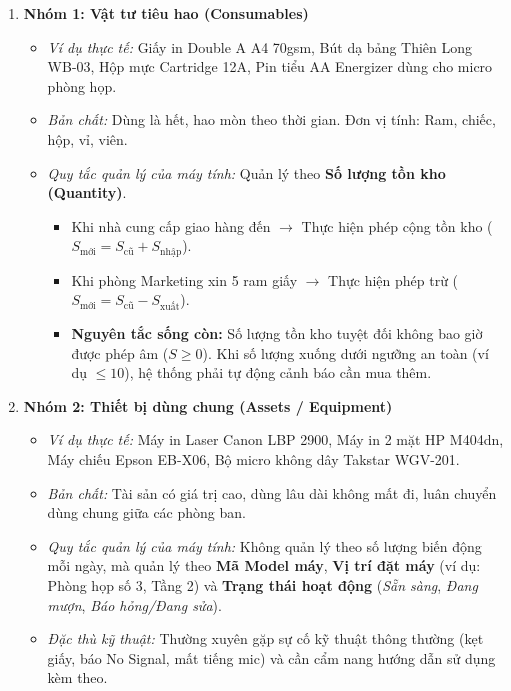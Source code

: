 \documentclass[11pt,a4paper]{article}
\begin{document}
\begin{enumerate}
    \item \textbf{Nhóm 1: Vật tư tiêu hao (Consumables)}
    \begin{itemize}
        \item \textit{Ví dụ thực tế:} Giấy in Double A A4 70gsm, Bút dạ bảng Thiên Long WB-03, Hộp mực Cartridge 12A, Pin tiểu AA Energizer dùng cho micro phòng họp.
        \item \textit{Bản chất:} Dùng là hết, hao mòn theo thời gian. Đơn vị tính: Ram, chiếc, hộp, vỉ, viên.
        \item \textit{Quy tắc quản lý của máy tính:} Quản lý theo \textbf{Số lượng tồn kho (Quantity)}. 
        \begin{itemize}
            \item Khi nhà cung cấp giao hàng đến $\rightarrow$ Thực hiện phép cộng tồn kho ($S_{\text{mới}} = S_{\text{cũ}} + S_{\text{nhập}}$).
            \item Khi phòng Marketing xin 5 ram giấy $\rightarrow$ Thực hiện phép trừ ($S_{\text{mới}} = S_{\text{cũ}} - S_{\text{xuất}}$).
            \item \textbf{Nguyên tắc sống còn:} Số lượng tồn kho tuyệt đối không bao giờ được phép âm ($S \ge 0$). Khi số lượng xuống dưới ngưỡng an toàn (ví dụ $\le 10$), hệ thống phải tự động cảnh báo cần mua thêm.
        \end{itemize}
    \end{itemize}

    \item \textbf{Nhóm 2: Thiết bị dùng chung (Assets / Equipment)}
    \begin{itemize}
        \item \textit{Ví dụ thực tế:} Máy in Laser Canon LBP 2900, Máy in 2 mặt HP M404dn, Máy chiếu Epson EB-X06, Bộ micro không dây Takstar WGV-201.
        \item \textit{Bản chất:} Tài sản có giá trị cao, dùng lâu dài không mất đi, luân chuyển dùng chung giữa các phòng ban.
        \item \textit{Quy tắc quản lý của máy tính:} Không quản lý theo số lượng biến động mỗi ngày, mà quản lý theo \textbf{Mã Model máy}, \textbf{Vị trí đặt máy} (ví dụ: Phòng họp số 3, Tầng 2) và \textbf{Trạng thái hoạt động} (\textit{Sẵn sàng}, \textit{Đang mượn}, \textit{Báo hỏng/Đang sửa}).
        \item \textit{Đặc thù kỹ thuật:} Thường xuyên gặp sự cố kỹ thuật thông thường (kẹt giấy, báo No Signal, mất tiếng mic) và cần cẩm nang hướng dẫn sử dụng kèm theo.
    \end{itemize}
\end{enumerate}
\end{document}
